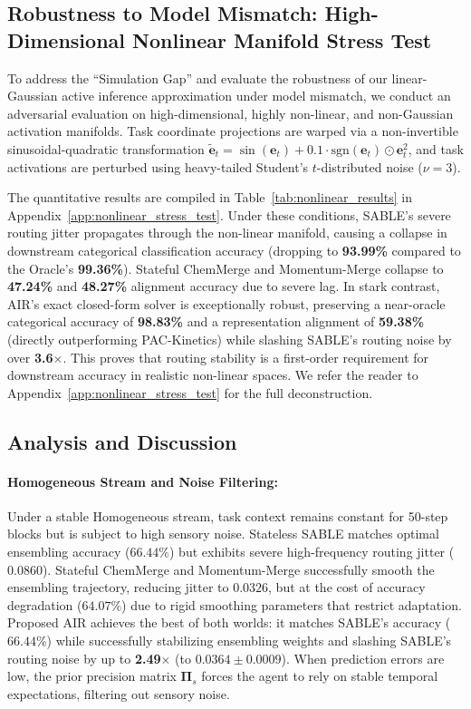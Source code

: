 \subsection{Robustness to Model Mismatch: High-Dimensional Nonlinear Manifold Stress Test}
\label{subsec:nonlinear_stress_test}
To address the ``Simulation Gap'' and evaluate the robustness of our linear-Gaussian active inference approximation under model mismatch, we conduct an adversarial evaluation on high-dimensional, highly non-linear, and non-Gaussian activation manifolds. Task coordinate projections are warped via a non-invertible sinusoidal-quadratic transformation $\tilde{\mathbf{e}}_t = \sin(\mathbf{e}_t) + 0.1 \cdot \text{sgn}(\mathbf{e}_t) \odot \mathbf{e}_t^2$, and task activations are perturbed using heavy-tailed Student's $t$-distributed noise ($\nu = 3$).

The quantitative results are compiled in Table~\ref{tab:nonlinear_results} in Appendix~\ref{app:nonlinear_stress_test}. Under these conditions, SABLE's severe routing jitter propagates through the non-linear manifold, causing a collapse in downstream categorical classification accuracy (dropping to \textbf{93.99\%} compared to the Oracle's \textbf{99.36\%}). Stateful ChemMerge and Momentum-Merge collapse to \textbf{47.24\%} and \textbf{48.27\%} alignment accuracy due to severe lag. In stark contrast, AIR's exact closed-form solver is exceptionally robust, preserving a near-oracle categorical accuracy of \textbf{98.83\%} and a representation alignment of \textbf{59.38\%} (directly outperforming PAC-Kinetics) while slashing SABLE's routing noise by over \textbf{3.6$\times$}. This proves that routing stability is a first-order requirement for downstream accuracy in realistic non-linear spaces. We refer the reader to Appendix~\ref{app:nonlinear_stress_test} for the full deconstruction.

\subsection{Analysis and Discussion}

\paragraph{Homogeneous Stream and Noise Filtering:}
Under a stable Homogeneous stream, task context remains constant for 50-step blocks but is subject to high sensory noise. Stateless SABLE matches optimal ensembling accuracy ($66.44\%$) but exhibits severe high-frequency routing jitter ($0.0860$). Stateful ChemMerge and Momentum-Merge successfully smooth the ensembling trajectory, reducing jitter to $0.0326$, but at the cost of accuracy degradation ($64.07\%$) due to rigid smoothing parameters that restrict adaptation. Proposed AIR achieves the best of both worlds: it matches SABLE's accuracy ($66.44\%$) while successfully stabilizing ensembling weights and slashing SABLE's routing noise by up to \textbf{2.49$\times$} (to $0.0364 \pm 0.0009$). When prediction errors are low, the prior precision matrix $\mathbf{\Pi}_s$ forces the agent to rely on stable temporal expectations, filtering out sensory noise.

